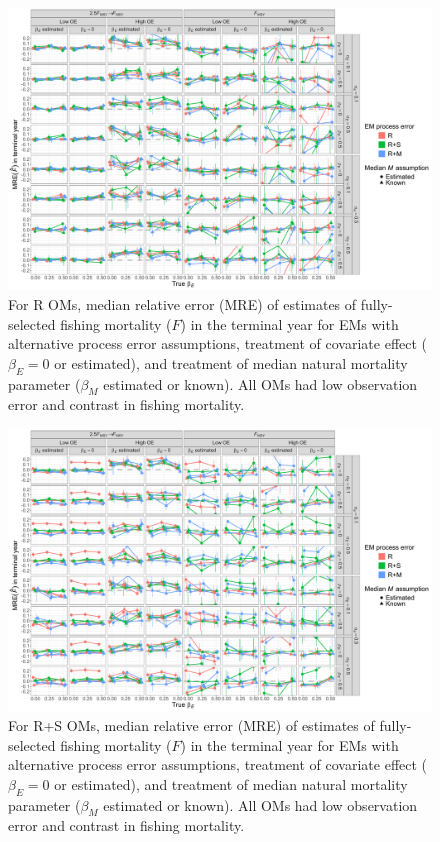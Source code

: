 \documentclass[
  12pt,
]{article}
\begin{document}
\begin{landscape}
\begin{figure}
\begin{center}
\includegraphics[height = \textheight]{terminal_year_F_bias_Rom}
\end{center}
\caption{For R OMs, median relative error (MRE) of estimates of fully-selected fishing mortality ($F$) in the terminal year for EMs with alternative process error assumptions, treatment of covariate effect ($\beta_E = 0$ or estimated), and treatment of median natural mortality parameter ($\beta_M$ estimated or known). All OMs had low observation error and contrast in fishing mortality.}\label{terminal_F_bias_Rom}
\end{figure}
\end{landscape}

\begin{landscape}
\begin{figure}
\begin{center}
\includegraphics[height = \textheight]{terminal_year_F_bias_RSom}
\end{center}
\caption{For R+S OMs, median relative error (MRE) of estimates of fully-selected fishing mortality ($F$) in the terminal year for EMs with alternative process error assumptions, treatment of covariate effect ($\beta_E = 0$ or estimated), and treatment of median natural mortality parameter ($\beta_M$ estimated or known). All OMs had low observation error and contrast in fishing mortality.}\label{terminal_F_bias_RSom}
\end{figure}
\end{landscape}
\end{document}
